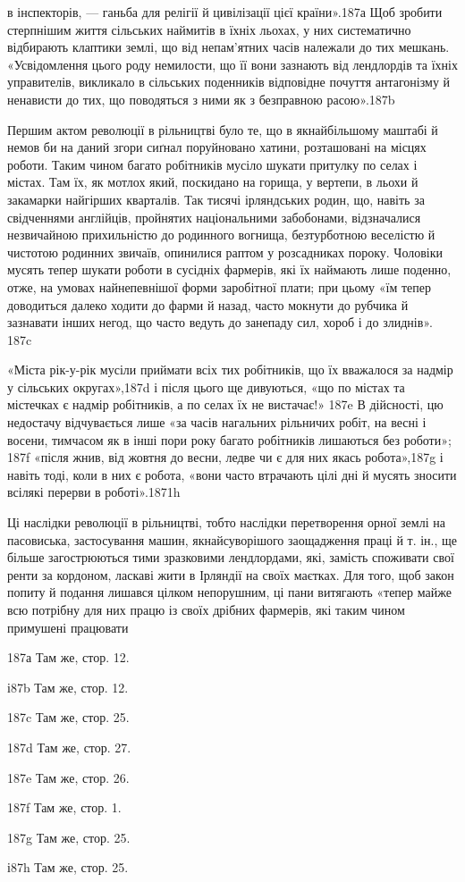 в інспекторів, — ганьба для релігії й цивілізації цієї країни».187а
Щоб зробити стерпнішим життя сільських наймитів в їхніх льохах,
у них систематично відбирають клаптики землі, що від непам’ятних
часів належали до тих мешкань. «Усвідомлення цього
роду немилости, що її вони зазнають від лендлордів та їхніх управителів,
викликало в сільських поденників відповідне почуття
антагонізму й ненависти до тих, що поводяться з ними як з безправною
расою».187b

Першим актом революції в рільництві було те, що в якнайбільшому
маштабі й немов би на даний згори сиґнал поруйновано
хатини, розташовані на місцях роботи. Таким чином багато робітників
мусіло шукати притулку по селах і містах. Там їх, як
мотлох який, поскидано на горища, у вертепи, в льохи й закамарки
найгірших кварталів. Так тисячі ірляндських родин, що,
навіть за свідченнями англійців, пройнятих національними забобонами,
відзначалися незвичайною прихильністю до родинного
вогнища, безтурботною веселістю й чистотою родинних звичаїв,
опинилися раптом у розсадниках пороку. Чоловіки мусять тепер
шукати роботи в сусідніх фармерів, які їх наймають лише поденно,
отже, на умовах найнепевнішої форми заробітної плати;
при цьому «їм тепер доводиться далеко ходити до фарми й назад,
часто мокнути до рубчика й зазнавати інших негод, що часто
ведуть до занепаду сил, хороб і до злиднів». 187c

«Міста рік-у-рік мусіли приймати всіх тих робітників, що
їх вважалося за надмір у сільських округах»,187d і після цього
ще дивуються, «що по містах та містечках є надмір робітників,
а по селах їх не вистачає!» 187e В дійсності, цю недостачу відчувається
лише «за часів нагальних рільничих робіт, на весні
і восени, тимчасом як в інші пори року багато робітників лишаються
без роботи»; 187f «після жнив, від жовтня до весни, ледве
чи є для них якась робота»,187g і навіть тоді, коли в них є робота,
«вони часто втрачають цілі дні й мусять зносити всілякі
перерви в роботі».1871h

Ці наслідки революції в рільництві, тобто наслідки перетворення
орної землі на пасовиська, застосування машин, якнайсуворішого
заощадження праці й т. ін., ще більше загострюються
тими зразковими лендлордами, які, замість споживати свої ренти
за кордоном, ласкаві жити в Ірляндії на своїх маєтках. Для того,
щоб закон попиту й подання лишався цілком непорушним, ці
пани витягають «тепер майже всю потрібну для них працю із
своїх дрібних фармерів, які таким чином примушені працювати

187а Там же, стор. 12.

і87b Там же, стор. 12.

187c Там же, стор. 25.

187d Там же, стор. 27.

187e Там же, стор. 26.

187f Там же, стор. 1.

187g Там же, стор. 25.

і87h Там же, стор. 25.

